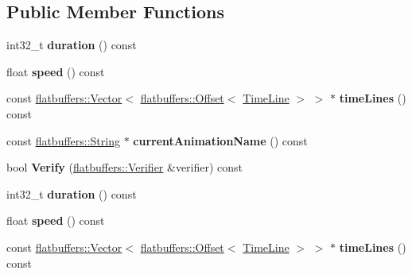 \subsection*{Public Member Functions}
\begin{DoxyCompactItemize}
\item 
\mbox{\label{structflatbuffers_1_1NodeAction_ae635f1cc4e74008fa034cbf2c820613f}} 
int32\+\_\+t {\bfseries duration} () const
\item 
\mbox{\label{structflatbuffers_1_1NodeAction_af37aa8e2bac68595b0d3daa026b0f5a6}} 
float {\bfseries speed} () const
\item 
\mbox{\label{structflatbuffers_1_1NodeAction_a040cfbd75fa24ccf9683ecdf7e2c3060}} 
const \hyperlink{classflatbuffers_1_1Vector}{flatbuffers\+::\+Vector}$<$ \hyperlink{structflatbuffers_1_1Offset}{flatbuffers\+::\+Offset}$<$ \hyperlink{structflatbuffers_1_1TimeLine}{Time\+Line} $>$ $>$ $\ast$ {\bfseries time\+Lines} () const
\item 
\mbox{\label{structflatbuffers_1_1NodeAction_a9c7e0f543d5a32a6430ee0e801236318}} 
const \hyperlink{structflatbuffers_1_1String}{flatbuffers\+::\+String} $\ast$ {\bfseries current\+Animation\+Name} () const
\item 
\mbox{\label{structflatbuffers_1_1NodeAction_ab231a89ca8cf2c8a9b0f195cce273f4d}} 
bool {\bfseries Verify} (\hyperlink{classflatbuffers_1_1Verifier}{flatbuffers\+::\+Verifier} \&verifier) const
\item 
\mbox{\label{structflatbuffers_1_1NodeAction_ae635f1cc4e74008fa034cbf2c820613f}} 
int32\+\_\+t {\bfseries duration} () const
\item 
\mbox{\label{structflatbuffers_1_1NodeAction_af37aa8e2bac68595b0d3daa026b0f5a6}} 
float {\bfseries speed} () const
\item 
\mbox{\label{structflatbuffers_1_1NodeAction_a040cfbd75fa24ccf9683ecdf7e2c3060}} 
const \hyperlink{classflatbuffers_1_1Vector}{flatbuffers\+::\+Vector}$<$ \hyperlink{structflatbuffers_1_1Offset}{flatbuffers\+::\+Offset}$<$ \hyperlink{structflatbuffers_1_1TimeLine}{Time\+Line} $>$ $>$ $\ast$ {\bfseries time\+Lines} () const

\end{DoxyCompactItemize}
